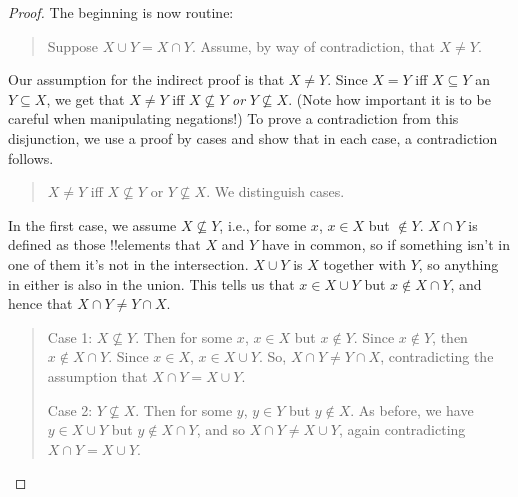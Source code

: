 \documentclass[../../../include/open-logic-section]{subfiles}
\begin{document}
\begin{proof}
The beginning is now routine:
\begin{quote}
  Suppose $X \cup Y = X \cap Y$. Assume, by way of contradiction, that
  $X \neq Y$.
\end{quote}
Our assumption for the indirect proof is that $X \neq Y$. Since $X =
Y$ iff $X \subseteq Y$ an $Y \subseteq X$, we get that $X \neq Y$ iff
$X \nsubseteq Y$ \emph{or} $Y \nsubseteq X$. (Note how important it is
to be careful when manipulating negations!{}) To prove a contradiction
from this disjunction, we use a proof by cases and show that in each
case, a contradiction follows.
\begin{quote}
$X \neq Y$ iff $X \nsubseteq Y$ or $Y \nsubseteq X$. We distinguish cases.
\end{quote}
In the first case, we assume $X \nsubseteq Y$, i.e., for some $x$, $x
\in X$ but $\notin Y$. $X \cap Y$ is defined as those !!{element}s
that $X$ and $Y$ have in common, so if something isn't in one of them
it's not in the intersection. $X \cup Y$ is $X$ together with $Y$, so
anything in either is also in the union. This tells us that $x \in X
\cup Y$ but $x \notin X \cap Y$, and hence that $X \cap Y \neq Y \cap
X$.
\begin{quote}
  Case 1: $X \nsubseteq Y$. Then for some $x$, $x \in X$ but $x \notin
  Y$. Since $x \notin Y$, then $x \notin X \cap Y$. Since $x \in X$,
  $x \in X \cup Y$. So, $X \cap Y \neq Y \cap X$, contradicting the
  assumption that $X \cap Y = X \cup Y$.

  Case 2: $Y \nsubseteq X$. Then for some $y$, $y \in Y$ but $y \notin
  X$. As before, we have $y \in X \cup Y$ but $y \notin X \cap Y$, and
  so $X \cap Y \neq X \cup Y$, again contradicting $X \cap Y = X \cup
  Y$. \qedhere
\end{quote}
\end{proof}
\end{document}
